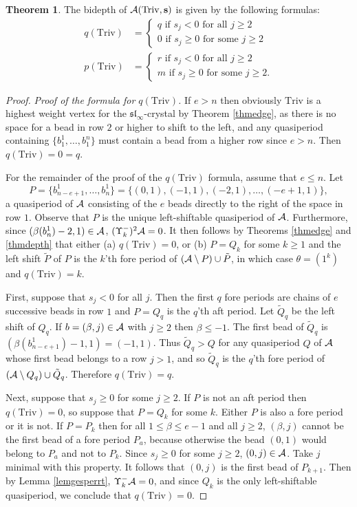 \documentclass[12pt]{amsart}
\numberwithin{equation}{section}
\theoremstyle{definition}
\newtheorem{theorem}[equation]{Theorem}
\newcommand{\slinf}{\mathfrak{sl}_\infty}
\newcommand{\triv}{\mathrm{Triv}}
\begin{document}
\begin{theorem}\label{thmbidepthtriv}
The bidepth of $\cA( \triv, \bs )$ is given by the following formulas: 
\begin{align*}
q(\triv)&=\begin{cases} q\mbox{ if } s_j<0\mbox{ for all }j\geq 2 \\
0\mbox{ if }s_j\geq 0\mbox{ for some }j \geq 2
\end{cases}\\
p(\triv)&=\begin{cases} r\mbox{ if }s_j<0\mbox{ for all }j\geq 2 \\
m \mbox{ if }s_j\geq 0 \mbox{ for some }j\geq 2.
\end{cases}
\end{align*}
\end{theorem}
\begin{proof}
\textit{Proof of the formula for $q(\triv)$.} If $e>n$ then obviously $\triv$ is a highest weight vertex for the $\slinf$-crystal by Theorem \ref{thmedge}, as there is no space for a bead in row $2$ or higher to shift to the left, and any quasiperiod containing $\{b_1^1,\dots,b_1^n\}$ must contain a bead from a higher row since $e>n$. Then $q(\triv)=0=q$. 

For the remainder of the proof of the $q(\triv)$ formula, assume that $e\leq n$. Let $$P=\{b_{n-e+1}^1,\dots,b_n^1\}=\{(0,1),(-1,1),(-2,1),\dots,(-e+1,1)\},$$ a quasiperiod of $\mathcal{A}$ consisting of the $e$ beads directly to the right of the space in row $1$. Observe that $P$ is the unique left-shiftable quasiperiod of $\mathcal{A}$. Furthermore, since $(\beta(b_n^1)-2,1)\in\mathcal{A}$, $(\Upsilon_k^-)^2\mathcal{A}=0$. It then  follows by Theorems \ref{thmedge} and \ref{thmdepth} that either (a) $q(\triv)=0$, or (b) $P=Q_k$ for some $k\geq 1$ and the left shift $\tilde{P}$ of $P$ is the $k$'th fore period of $(\mathcal{A}\setminus P)\cup\tilde{P}$, in which case $\theta=(1^k)$ and $q(\triv)=k$.

First, suppose that $s_j<0$ for all $j$. Then the first $q$ fore periods are chains of $e$ successive beads in row $1$ and $P=Q_q$ is the $q$'th aft period. Let $\tilde{Q}_q$ be the left shift of $Q_q$. If $b=(\beta,j)\in\mathcal{A}$ with $j\geq 2$ then $\beta\leq -1$. The first bead of $\tilde{Q}_q$ is $(\beta(b_{n-e+1}^1)-1,1)=(-1,1)$. Thus $\tilde{Q}_q>Q$ for any quasiperiod $Q$ of $\mathcal{A}$ whose first bead belongs to a row $j>1$, and so $\tilde{Q}_q$ is the $q$'th fore period of $(\mathcal{A}\setminus Q_q)\cup \tilde{Q}_q$. Therefore $q(\triv)=q$. 

Next, suppose that $s_j\geq 0$ for some $j\geq 2$. If $P$ is not an aft period then $q(\triv)=0$, so suppose that $P=Q_k$ for some $k$. Either $P$ is also a fore period or it is not. If $P=P_k$ then for all $1\leq \beta \leq e-1$ and all $j\geq 2$, $(\beta,j)$ cannot be the first bead of a fore period $P_a$, because otherwise the bead $(0,1)$ would belong to $P_a$ and not to $P_k$. Since $s_j\geq 0$ for some $j\geq 2$, $(0,j)\in\mathcal{A}$. Take $j$ minimal with this property. It follows that $(0,j)$ is the first bead of $P_{k+1}$. Then by Lemma \ref{lemgesperrt}, $\Upsilon_k^-\mathcal{A}=0$, and since $Q_k$ is the only left-shiftable quasiperiod, we conclude that $q(\triv)=0$. 


\end{proof}
\end{document}
